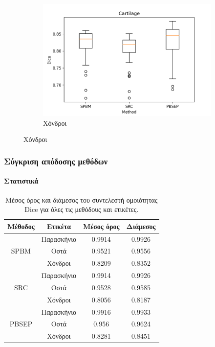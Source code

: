 \documentclass{beamer}
\begin{document}
\begin{frame}
\begin{figure}[H]
    \begin{subfigure}[b]{0.42\linewidth}
    \includegraphics[width=\linewidth]{Dice_final_Cartilage_plot.png}
    \caption{Χόνδροι}
    \end{subfigure}
\end{figure}

\end{frame}


\begin{frame}
\frametitle{Σύγκριση απόδοσης μεθόδων}
\framesubtitle{Στατιστικά}

\begin{table}[h!]
    \centering
    \begin{tabular}{|c|c||c|c|} 
        \hline
        Μέθοδος & Ετικέτα & Μέσος όρος & Διάμεσος \\ 
        \hline
        \hline
        \multirow{3}{4em}{SPBM} & Παρασκήνιο & 0.9914 & 0.9926 \\ 
        & Οστά & 0.9521 & 0.9556 \\ 
        & Χόνδροι & 0.8209 & 0.8352 \\ 
        \hline
        \multirow{3}{4em}{SRC} & Παρασκήνιο & 0.9914 & 0.9926 \\ 
        & Οστά & 0.9528 & 0.9585 \\ 
        & Χόνδροι & 0.8056 & 0.8187 \\ 
        \hline
        \multirow{3}{4em}{PBSEP} & Παρασκήνιο & 0.9916 & 0.9933 \\ 
        & Οστά & 0.956 & 0.9624 \\ 
        & Χόνδροι & 0.8281 & 0.8451 \\ 
        \hline
    \end{tabular}
    \caption{Μέσος όρος και διάμεσος του συντελεστή ομοιότητας Dice για όλες
             τις μεθόδους και ετικέτες.}
\end{table}

\end{frame}
\end{document}
